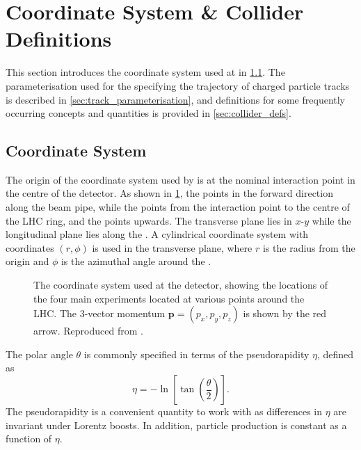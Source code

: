 \section{Coordinate System \& Collider Definitions}

This section introduces the coordinate system used at \ATLAS in \cref{sec:coord_sys}.
The parameterisation used for the specifying the trajectory of charged particle tracks is described in \cref{sec:track_parameterisation}, and definitions for some frequently occurring concepts and quantities is provided in \cref{sec:collider_defs}.

\subsection{\ATLAS Coordinate System}\label{sec:coord_sys}


The origin of the coordinate system used by \ATLAS is at the nominal interaction point in the centre of the detector.
As shown in \cref{fig:atlas_coord_system}, the  points in the forward direction along the beam pipe, while the  points from the interaction point to the centre of the LHC ring, and the  points upwards.
The transverse plane lies in $x$\nobreakdash-$y$ while the longitudinal plane lies along the .
A cylindrical coordinate system with coordinates $(r,\phi)$ is used in the transverse plane, where $r$ is the radius from the origin and $\phi$ is the azimuthal angle around the .

\begin{figure}[!htbp]
  \centering
  
  \caption{
    The coordinate system used at the \ATLAS detector, showing the locations of the four main experiments located at various points around the LHC.
    The 3-vector momentum $\bm{p} = (p_x, p_y, p_z)$ is shown by the red arrow.
    Reproduced from .
  }
  \label{fig:atlas_coord_system}
\end{figure}



The polar angle $\theta$ is commonly specified in terms of the pseudorapidity $\eta$, defined as
%
\begin{equation}\label{eq:pseudorap}
  \eta = - \ln \left[ \tan \left( \frac{\theta}{2} \right) \right] .
\end{equation}
%
The pseudorapidity is a convenient quantity to work with as differences in $\eta$ are invariant under Lorentz boosts.
In addition, particle production is constant as a function of $\eta$.

